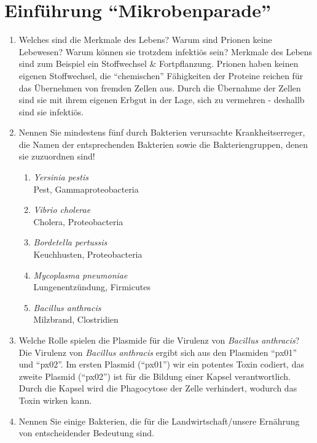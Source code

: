
\section{Einführung ``Mikrobenparade''}
	\begin{enumerate}
		\item Welches sind die Merkmale des Lebens? Warum sind Prionen keine Lebewesen? Warum können sie trotzdem infektiös sein? \hfill \vspace{4mm}
		Merkmale des Lebens sind zum Beispiel ein Stoffwechsel \& Fortpflanzung.
		Prionen haben keinen eigenen Stoffwechsel,
		die ``chemischen'' Fähigkeiten der Proteine reichen für das Übernehmen von fremden Zellen aus.
		Durch die Übernahme der Zellen sind sie mit ihrem eigenen Erbgut in der Lage,
		sich zu vermehren - deshallb sind sie infektiös.

	\item Nennen Sie mindestens fünf durch Bakterien verursachte Krankheitserreger, die Namen der entsprechenden Bakterien sowie die Bakteriengruppen, denen sie zuzuordnen sind!
		\begin{enumerate}
			\item \emph{Yersinia pestis} \hfill \\
				Pest, Gammaproteobacteria
			\item \emph{Vibrio cholerae} \hfill \\
				Cholera, Proteobacteria
			\item \emph{Bordetella pertussis} \hfill \\
				Keuchhusten, Proteobacteria
			\item \emph{Mycoplasma pneumoniae} \hfill \\
				Lungenentzündung, Firmicutes
			\item \emph{Bacillus anthracis} \hfill \\
				Milzbrand, Clostridien
		\end{enumerate}

	\item Welche Rolle spielen die Plasmide für die Virulenz von \emph{Bacillus anthracis}?  \hfill \vspace{4mm} \\
			Die Virulenz von \emph{Bacillus anthracis} ergibt sich
			aus den Plasmiden ``px01'' und ``px02''.
			Im ersten Plasmid (``px01'') wir ein potentes Toxin codiert,
			das zweite Plasmid (``px02'') ist für die Bildung einer Kapsel verantwortlich.
			Durch die Kapsel wird die Phagocytose der Zelle verhindert,
			wodurch das Toxin wirken kann.

		\item Nennen Sie einige Bakterien, die für die Landwirtschaft/unsere Ernährung von entscheidender Bedeutung sind. \hfill \\
	\end{enumerate}


